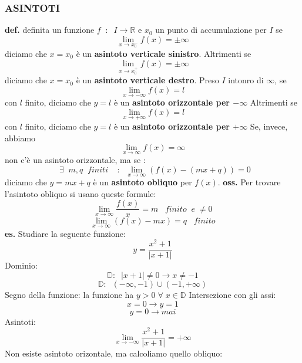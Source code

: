 \subsubsection*{ASINTOTI}
\textbf{def.}  definita un funzione $f \;\;:\;\; I \rightarrow \mathbb{R}$ e $x_0$ un punto di accumulazione per $I$ se
\[
    \lim_{x\rightarrow x_0^-} f(x) = \pm \infty
\]
diciamo che $x = x_0$ è un \textbf{asintoto verticale sinistro}.
\newline
Altrimenti se
\[
    \lim_{x\rightarrow x_0^+} f(x)  = \pm \infty
\]
diciamo che $x= x_0$ è un \textbf{asintoto verticale destro}.
\newline
\newline
\newline
Preso $I$ intonro di $\infty$, se
\[
    \lim_{x\rightarrow -\infty} f(x) = l
\]
con $l$ finito, diciamo che $y= l$ è un \textbf{asintoto orizzontale per $- \infty$}
\newline
Altrimenti se
\[
    \lim_{x\rightarrow +\infty} f(x) = l
\]
con $l$ finito, diciamo che $y= l$ è un \textbf{asintoto orizzontale per $+ \infty$}
\newline
\newline
\newline
Se, invece, abbiamo
\[
    \lim_{x\rightarrow \infty} f(x) = \infty
\]
non c'è un asintoto orizzontale, ma se :
\[
    \;\;\exists\;\;m,q \;\; finiti \;\; \;\;:\;\; \lim_{x\rightarrow \infty}(f(x)-(mx+q))=0
\]
diciamo che $y= mx + q$  è un \textbf{asintoto obliquo} per $f(x)$.
\newline
\textbf{oss.} Per trovare l'asintoto obliquo si usano queste formule:
\[
    \lim_{x\rightarrow \infty} \frac{f(x)}{x}= m \;\;\; finito \;\; e \; \neq 0
\]
\[
    \lim_{x\rightarrow \infty}(f(x)-mx) = q \;\;\;finito
\]
\newline
\newline
\newline
\newline
\textbf{es.} Studiare la seguente funzione:
\[
    y= \frac{x^2 +1}{|x+1|}
\]
Dominio:
\[
    \mathbb{D}: \;\; |x+1| \neq 0 \rightarrow x \neq -1
\]
\[
    \mathbb{D}: \;\; (-\infty,-1)\cup(-1,+\infty)
\]
Segno della funzione:
\newline
la funzione ha $y>0 \;\forall\; x \in \mathbb{D}$
\newline
Intersezione con gli assi:
\[
    x=0 \rightarrow  y=1
\]
\[
    y=0 \rightarrow mai
\]
Asintoti:
\[
    \lim_{x\rightarrow -\infty} \frac{x^2 +1 }{|x+1|} = + \infty
\]
Non esiste asintoto orizontale, ma calcoliamo quello obliquo:
